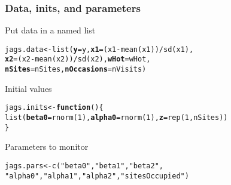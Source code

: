 \documentclass[color=usenames,dvipsnames]{beamer}\usepackage[]{graphicx}\usepackage[]{xcolor}
\makeatletter
\newcommand{\hlnum}[1]{\textcolor[rgb]{0.69,0.494,0}{#1}}%
\newcommand{\hlstr}[1]{\textcolor[rgb]{0.749,0.012,0.012}{#1}}%
\newcommand{\hlopt}[1]{\textcolor[rgb]{0,0,0}{#1}}%
\newcommand{\hlstd}[1]{\textcolor[rgb]{0,0,0}{#1}}%
\newcommand{\hlkwa}[1]{\textcolor[rgb]{0,0,0}{\textbf{#1}}}%
\newcommand{\hlkwb}[1]{\textcolor[rgb]{0,0.341,0.682}{#1}}%
\newcommand{\hlkwc}[1]{\textcolor[rgb]{0,0,0}{\textbf{#1}}}%
\newcommand{\hlkwd}[1]{\textcolor[rgb]{0.004,0.004,0.506}{#1}}%
\newenvironment{kframe}{%
 \def\at@end@of@kframe{}%
 \ifinner\ifhmode%
  \def\at@end@of@kframe{\end{minipage}}%
  \begin{minipage}{\columnwidth}%
 \fi\fi%
 \def\FrameCommand##1{\hskip\@totalleftmargin \hskip-\fboxsep
 \colorbox{shadecolor}{##1}\hskip-\fboxsep
     \hskip-\linewidth \hskip-\@totalleftmargin \hskip\columnwidth}%
 \MakeFramed {\advance\hsize-\width
   \@totalleftmargin\z@ \linewidth\hsize
   \@setminipage}}%
 {\par\unskip\endMakeFramed%
 \at@end@of@kframe}
\newenvironment{knitrout}{}{} %
\makeatother
\begin{document}
\begin{frame}[fragile]
  \frametitle{Data, inits, and parameters}
  Put data in a named list
  \vspace{-12pt}
\begin{knitrout}\small
{}\color{fgcolor}\begin{kframe}
\begin{alltt}
\hlstd{jags.data} \hlkwb{<-} \hlkwd{list}\hlstd{(}\hlkwc{y}\hlstd{=y,} \hlkwc{x1}\hlstd{=(x1}\hlopt{-}\hlkwd{mean}\hlstd{(x1))}\hlopt{/}\hlkwd{sd}\hlstd{(x1),}
                  \hlkwc{x2}\hlstd{=(x2}\hlopt{-}\hlkwd{mean}\hlstd{(x2))}\hlopt{/}\hlkwd{sd}\hlstd{(x2),} \hlkwc{wHot}\hlstd{=wHot,}
                  \hlkwc{nSites}\hlstd{=nSites,} \hlkwc{nOccasions}\hlstd{=nVisits)}
\end{alltt}
\end{kframe}
\end{knitrout}
\pause
\vfill
  Initial values
  \vspace{-12pt}
\begin{knitrout}\small
{}\color{fgcolor}\begin{kframe}
\begin{alltt}
\hlstd{jags.inits} \hlkwb{<-} \hlkwa{function}\hlstd{() \{}
    \hlkwd{list}\hlstd{(}\hlkwc{beta0}\hlstd{=}\hlkwd{rnorm}\hlstd{(}\hlnum{1}\hlstd{),} \hlkwc{alpha0}\hlstd{=}\hlkwd{rnorm}\hlstd{(}\hlnum{1}\hlstd{),} \hlkwc{z}\hlstd{=}\hlkwd{rep}\hlstd{(}\hlnum{1}\hlstd{, nSites))}
\hlstd{\}}
\end{alltt}
\end{kframe}
\end{knitrout}
\pause
\vfill
  Parameters to monitor
  \vspace{-12pt}
\begin{knitrout}\small
{}\color{fgcolor}\begin{kframe}
\begin{alltt}
\hlstd{jags.pars} \hlkwb{<-} \hlkwd{c}\hlstd{(}\hlstr{"beta0"}\hlstd{,} \hlstr{"beta1"}\hlstd{,} \hlstr{"beta2"}\hlstd{,}
               \hlstr{"alpha0"}\hlstd{,} \hlstr{"alpha1"}\hlstd{,} \hlstr{"alpha2"}\hlstd{,} \hlstr{"sitesOccupied"}\hlstd{)}
\end{alltt}
\end{kframe}
\end{knitrout}
\end{frame}
\end{document}
